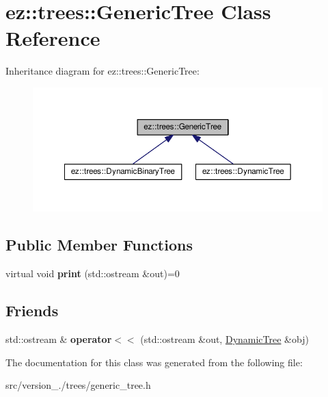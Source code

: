 \hypertarget{classez_1_1trees_1_1GenericTree}{}\section{ez\+:\+:trees\+:\+:Generic\+Tree Class Reference}
\label{classez_1_1trees_1_1GenericTree}


Inheritance diagram for ez\+:\+:trees\+:\+:Generic\+Tree\+:
\nopagebreak
\begin{figure}[H]
\begin{center}
\leavevmode
\includegraphics[width=350pt]{classez_1_1trees_1_1GenericTree__inherit__graph}
\end{center}
\end{figure}
\subsection*{Public Member Functions}
\begin{DoxyCompactItemize}
\item 
\mbox{\label{classez_1_1trees_1_1GenericTree_a592c6880012b7eea9d5d982b9801ee79}} 
virtual void {\bfseries print} (std\+::ostream \&out)=0
\end{DoxyCompactItemize}
\subsection*{Friends}
\begin{DoxyCompactItemize}
\item 
\mbox{\label{classez_1_1trees_1_1GenericTree_a325057120eaf73f31376e04f3d6ece45}} 
std\+::ostream \& {\bfseries operator$<$$<$} (std\+::ostream \&out, \hyperlink{classez_1_1trees_1_1DynamicTree}{Dynamic\+Tree} \&obj)
\end{DoxyCompactItemize}


The documentation for this class was generated from the following file\+:\begin{DoxyCompactItemize}
\item 
src/version\+\_./trees/generic\+\_\+tree.\+h\end{DoxyCompactItemize}
